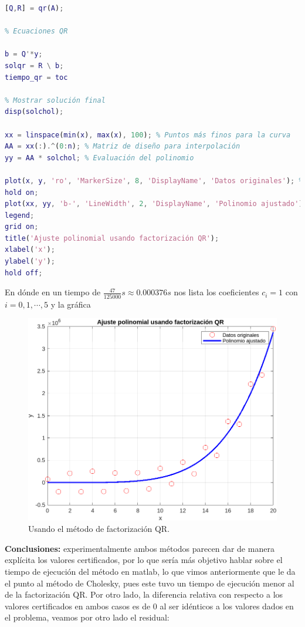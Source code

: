 \begin{homeworkProblem}
\begin{solucion}
\begin{enumerate}
\begin{lstlisting}[language = matlab]
% Factorización QR
[Q,R] = qr(A);

% Ecuaciones QR

b = Q'*y;
solqr = R \ b;
tiempo_qr = toc

% Mostrar solución final
disp(solchol);

xx = linspace(min(x), max(x), 100); % Puntos más finos para la curva
AA = xx(:).^(0:n); % Matriz de diseño para interpolación
yy = AA * solchol; % Evaluación del polinomio

plot(x, y, 'ro', 'MarkerSize', 8, 'DisplayName', 'Datos originales'); % Puntos originales
hold on;
plot(xx, yy, 'b-', 'LineWidth', 2, 'DisplayName', 'Polinomio ajustado'); % Polinomio
legend;
grid on;
title('Ajuste polinomial usando factorización QR');
xlabel('x');
ylabel('y');
hold off;
        \end{lstlisting}
        En dónde en un tiempo de $\frac{47}{125000}s\approx 0.000376 s$ nos lista los coeficientes $c_i=1$ con $i=0,1,\cdots,5$ y la gráfica 
        \begin{figure}[H]
          \begin{center}
            \includegraphics[scale=0.7]{Figures/qrpunto2.png}
          \end{center}
          \caption{Usando el método de factorización QR.}
        \end{figure} 
    \end{enumerate}
    \textbf{Conclusiones:} experimentalmente ambos métodos parecen dar de manera explícita los valores certificados, por lo que sería más objetivo hablar sobre el tiempo de ejecución del método en matlab, lo que vimos anteriormente que le da el punto al método de Cholesky, pues este tuvo un tiempo de ejecución menor al de la factorización QR. Por otro lado, la diferencia relativa con respecto a los valores certificados en ambos casos es de $0$ al ser idénticos a los valores dados en el problema, veamos por otro lado el residual:

\end{solucion}
\end{homeworkProblem}
